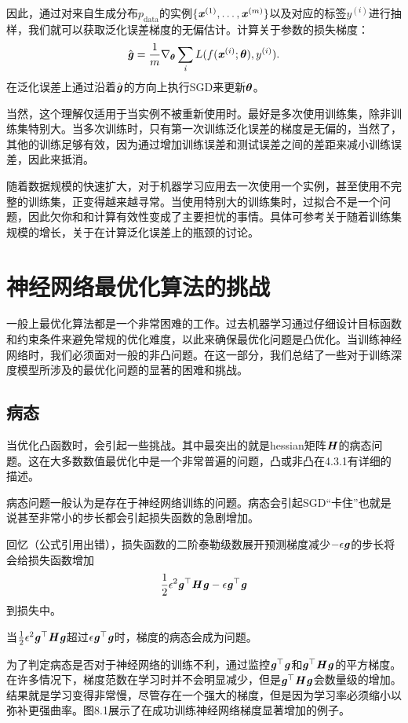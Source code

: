 因此，通过对来自生成分布$p_\text{data}$的实例$\{ \boldsymbol{\mathit{x}}^{(1)}, \dots,\boldsymbol{\mathit{x}}^{(m)} \}$以及对应的标签$y^{(i)}$进行抽样，我们就可以获取泛化误差梯度的无偏估计。计算关于参数的损失梯度：
\begin{equation}
\label{eq:8.9}
    \hat{\boldsymbol{\mathit{g}}} = \frac{1}{m} \nabla_{\boldsymbol{\theta}} \sum_i L(f(\boldsymbol{\mathit{x}}^{(i)};\boldsymbol{\theta}),y^{(i)} ).
\end{equation}
在泛化误差上通过沿着$\hat{\boldsymbol{\mathit{g}}}$的方向上执行SGD来更新$\boldsymbol{\theta}$。

当然，这个理解仅适用于当实例不被重新使用时。最好是多次使用训练集，除非训练集特别大。当多次训练时，只有第一次训练泛化误差的梯度是无偏的，当然了，其他的训练足够有效，因为通过增加训练误差和测试误差之间的差距来减小训练误差，因此来抵消。

随着数据规模的快速扩大，对于机器学习应用去一次使用一个实例，甚至使用不完整的训练集，正变得越来越寻常。当使用特别大的训练集时，过拟合不是一个问题，因此欠你和和计算有效性变成了主要担忧的事情。具体可参考\cite{bottou-bousquet-2008}关于随着训练集规模的增长，关于在计算泛化误差上的瓶颈的讨论。

\section{神经网络最优化算法的挑战}
一般上最优化算法都是一个非常困难的工作。过去机器学习通过仔细设计目标函数和约束条件来避免常规的优化难度，以此来确保最优化问题是凸优化。当训练神经网络时，我们必须面对一般的非凸问题。在这一部分，我们总结了一些对于训练深度模型所涉及的最优化问题的显著的困难和挑战。

\subsection{病态}
当优化凸函数时，会引起一些挑战。其中最突出的就是hessian矩阵$\boldsymbol{\mathit{H}}$的病态问题。这在大多数数值最优化中是一个非常普遍的问题，凸或非凸在4.3.1有详细的描述。

病态问题一般认为是存在于神经网络训练的问题。病态会引起SGD“卡住”也就是说甚至非常小的步长都会引起损失函数的急剧增加。

回忆（公式引用出错），损失函数的二阶泰勒级数展开预测梯度减少$-\epsilon\boldsymbol{\mathit{g}}$的步长将会给损失函数增加
\begin{equation}
    \frac{1}{2} \epsilon^2 \boldsymbol{\mathit{g}}^\top \boldsymbol{\mathit{H}}\boldsymbol{\mathit{g}} - \epsilon\boldsymbol{\mathit{g}}^\top\boldsymbol{\mathit{g}}
\end{equation}
到损失中。

当$\frac{1}{2} \epsilon^2 \boldsymbol{\mathit{g}}^\top\boldsymbol{\mathit{H}}\boldsymbol{\mathit{g}}$超过$\epsilon\boldsymbol{\mathit{g}}^\top\boldsymbol{\mathit{g}}$时，梯度的病态会成为问题。

为了判定病态是否对于神经网络的训练不利，通过监控$\boldsymbol{\mathit{g}}^\top\boldsymbol{\mathit{g}}$和$\boldsymbol{\mathit{g}}^\top \boldsymbol{\mathit{H}}\boldsymbol{\mathit{g}}$的平方梯度。在许多情况下，梯度范数在学习时并不会明显减少，但是$\boldsymbol{\mathit{g}}^\top\boldsymbol{\mathit{H}}\boldsymbol{\mathit{g}}$会数量级的增加。结果就是学习变得非常慢，尽管存在一个强大的梯度，但是因为学习率必须缩小以弥补更强曲率。图8.1展示了在成功训练神经网络梯度显著增加的例子。

